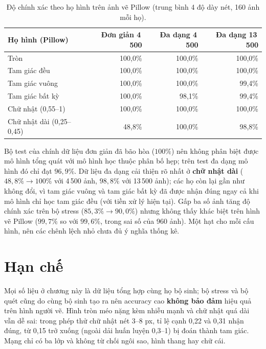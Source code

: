 \begin{table}[H]\centering\small
\begin{tabular}{lrrr}
\toprule
Họ hình (Pillow) & Đơn giản 4\,500 & Đa dạng 4\,500 & Đa dạng 13\,500 \\
\midrule
Tròn & 100,0\% & 100,0\% & 100,0\% \\
Tam giác đều & 100,0\% & 100,0\% & 100,0\% \\
Tam giác vuông & 100,0\% & 100,0\% & 99,4\% \\
Tam giác bất kỳ & 100,0\% & 98,1\% & 99,4\% \\
Chữ nhật (0,55--1) & 100,0\% & 100,0\% & 100,0\% \\
Chữ nhật dài (0,25--0,45) & 48,8\% & 100,0\% & 98,8\% \\
\bottomrule
\end{tabular}
\caption{Độ chính xác theo họ hình trên ảnh vẽ Pillow (trung bình 4 độ dày nét, 160 ảnh mỗi họ).}
\end{table}

Bộ test của chính dữ liệu đơn giản đã bão hòa ($100\%$) nên không phân biệt được mô hình tổng quát với mô hình học thuộc phân bố hẹp; trên test đa dạng mô hình đó chỉ đạt $96{,}9\%$.
Dữ liệu đa dạng cải thiện rõ nhất ở \textbf{chữ nhật dài} ($48{,}8\%\to100\%$ với 4\,500 ảnh, $98{,}8\%$ với 13\,500 ảnh); các họ còn lại gần như không đổi, vì tam giác vuông và tam giác bất kỳ
đã được nhận đúng ngay cả khi mô hình chỉ học tam giác đều (với tiền xử lý hiện tại). Gấp ba số ảnh tăng độ chính xác trên bộ stress ($85{,}3\%\to90{,}0\%$) nhưng không thấy khác biệt trên hình vẽ Pillow ($99{,}7\%$ so với $99{,}6\%$, trong sai số của 960 ảnh).
Một hạt cho mỗi cấu hình, nên các chênh lệch nhỏ chưa đủ ý nghĩa thống kê.

\section{Hạn chế}
Mọi số liệu ở chương này là dữ liệu tổng hợp cùng họ bộ sinh; bộ stress và bộ quét cũng do cùng bộ sinh tạo ra nên accuracy cao \textbf{không bảo đảm} hiệu quả trên hình người vẽ.
Hình tròn méo nặng kèm nhiễu mạnh và chữ nhật quá dài vẫn dễ sai: trong phép thử chữ nhật nét 3--8 px, tỉ lệ cạnh 0,22 và 0,31 nhận đúng, từ 0,15 trở xuống (ngoài dải huấn luyện 0,3--1) bị đoán thành tam giác. Mạng chỉ có ba lớp và không từ chối ngôi sao, hình thang hay chữ cái.
